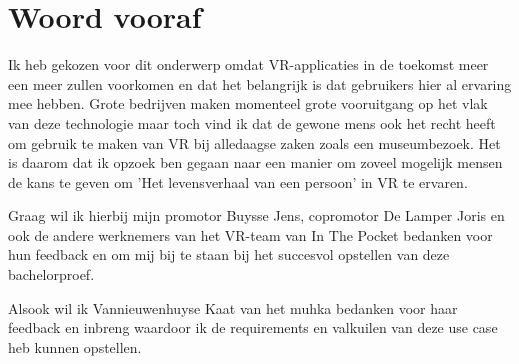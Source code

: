 
\chapter*{Woord vooraf}
\label{ch:voorwoord}

Ik heb gekozen voor dit onderwerp omdat VR-applicaties in de toekomst meer een meer zullen voorkomen en dat het belangrijk is dat gebruikers hier al ervaring mee hebben. Grote bedrijven maken momenteel grote vooruitgang op het vlak van deze technologie maar toch vind ik dat de gewone mens ook het recht heeft om gebruik te maken van VR bij alledaagse zaken zoals een museumbezoek. Het is daarom dat ik opzoek ben gegaan naar een manier om zoveel mogelijk mensen de kans te geven om 'Het levensverhaal van een persoon' in VR te ervaren.

Graag wil ik hierbij mijn promotor Buysse Jens, copromotor De Lamper Joris en ook de andere werknemers van het VR-team van In The Pocket bedanken voor hun feedback en om mij bij te staan bij het succesvol opstellen van deze bachelorproef.

Alsook wil ik Vannieuwenhuyse Kaat van het \acrfull{muhka} bedanken voor haar feedback en inbreng waardoor ik de requirements en valkuilen van deze use case heb kunnen opstellen.
